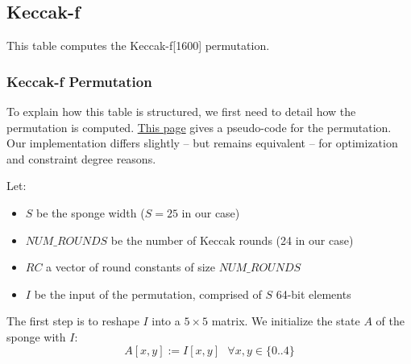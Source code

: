 \subsection{Keccak-f}
\label{keccak-f}

This table computes the Keccak-f[1600] permutation.

\subsubsection{Keccak-f Permutation}
To explain how this table is structured, we first need to detail how the permutation is computed. \href{https://keccak.team/keccak_specs_summary.html}{This page} gives a pseudo-code for the permutation. Our implementation differs slightly -- but remains equivalent -- for optimization and constraint degree reasons. 

Let:
\begin{itemize}
    \item $S$ be the sponge width ($S=25$ in our case)
    \item $NUM\_ROUNDS$ be the number of Keccak rounds (24 in our case)
    \item $RC$ a vector of round constants of size $NUM\_ROUNDS$
    \item $I$ be the input of the permutation, comprised of $S$ 64-bit elements
\end{itemize}    

The first step is to reshape $I$ into a $5 \times 5$ matrix. We initialize the state $A$ of the sponge with $I$: $$A[x, y] := I[x, y] \text{ }  \forall x, y \in \{0..4\}$$

